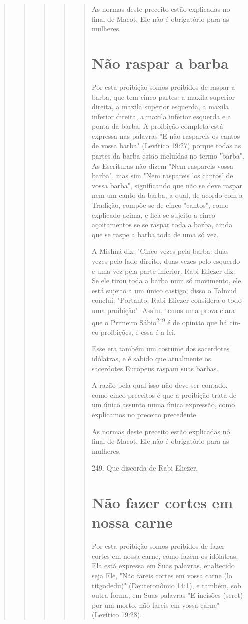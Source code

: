 \begin{quote}
\begin{quote}
\begin{quote}
\begin{quote}
\begin{quote}
As normas deste preceito estão explicadas no final de Macot. Ele não é
obrigatório para as mulheres.

\section{Não raspar a barba}

Por esta proibição somos proibidos de raspar a barba, que tem cin­co
partes: a maxila superior direita, a maxila superior esquerda, a maxila
infe­rior direita, a maxila inferior esquerda e a ponta da barba. A
proibição comple­ta está expressa nas palavras "E não raspareis os
cantos de vossa barba" (Levíti­co 19:27) porque todas as partes da barba
estão incluídas no termo "barba". As Escrituras não dizem "Nem raspareis
vossa barba", mas sim "Nem raspareis 'os cantos' de vossa barba",
significando que não se deve raspar nem um canto da barba, a qual, de
acordo com a Tradição, compõe-se de cinco "cantos", co­mo explicado
acima, e fica-se sujeito a cinco açoitamentos se se raspar toda a barba,
ainda que se raspe a barba toda de uma só vez.

A Mishná diz: "Cinco vezes pela barba: duas vezes pelo lado direito,
duas vezes pelo esquerdo e uma vez pela parte inferior. Rabi Eliezer
diz: Se ele tirou toda a barba num só movimento, ele está sujeito a um
único castigo; disso o Talmud conclui: "Portanto, Rabi Eliezer considera
o todo uma proibição". Assim, temos uma prova clara que o Primeiro
Sábio\textsuperscript{249} é de opinião que há cin­co proibições, e essa
é a lei.

Esse era também um costume dos sacerdotes idólatras, e é sabido que
atualmente os sacerdotes Europeus raspam suas barbas.

A razão pela qual isso não deve ser contado. como cinco preceitos é que
a proibição trata de um único assunto numa única expressão, como
ex­plicamos no preceito precedente.

As normas deste preceito estão explicadas nó final de Macot. Ele não é
obrigatório para as mulheres.

249. Que discorda de Rabi Eliezer.

\section{Não fazer cortes em nossa carne}

Por esta proibição somos proibidos de fazer cortes em nossa carne, como
fazem os idólatras. Ela está expressa em Suas palavras, enaltecido seja
Ele, "Não fareis cortes em vossa carne (lo titgodedu)" (Deuteronômio
14:1), e tam­bém, sob outra forma, em Suas palavras "E incisões (seret)
por um morto, não fareis em vossa carne" (Levítico 19:28).


\end{quote}
\end{quote}
\end{quote}
\end{quote}
\end{quote}
